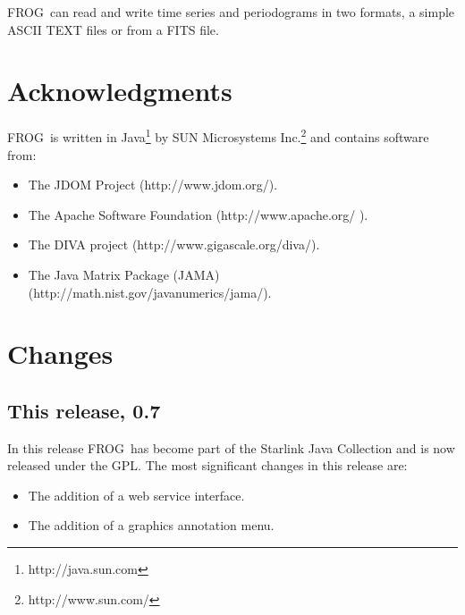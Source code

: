 \documentclass[twoside,11pt]{article}
\newcommand{\htmladdnormallinkfoot}[2]{#1\footnote{#2}}
\newcommand{\htmladdnormallink}[2]{#1}
\newcommand{\xlabel}[1]{}
\renewcommand{\_}{\texttt{\symbol{95}}}
\newcommand{\FROG}{\textsf{FROG}}
\begin{document}
\FROG\ can read and write time series and periodograms in two formats, a simple ASCII TEXT files or from a FITS file.


\section{Acknowledgments\xlabel{acknowledgements}}

\FROG\ is written in
\htmladdnormallinkfoot{Java}{http://java.sun.com} by
\htmladdnormallinkfoot{SUN Microsystems Inc.}{http://www.sun.com/} and
contains software from:
\begin{itemize}
\item The JDOM Project (\htmladdnormallink{http://www.jdom.org/}
                        {http://www.jdom.org/}).
\item The Apache Software Foundation
      (\htmladdnormallink{http://www.apache.org/}{http://www.apache.org/} ).
\item The DIVA project
      (\htmladdnormallink{http://www.gigascale.org/diva/}
                         {http://www.gigascale.org/diva/}).
\item The Java Matrix Package (JAMA)
      (\htmladdnormallink{http://math.nist.gov/javanumerics/jama/}
                         {http://math.nist.gov/javanumerics/jama/}).
\end{itemize}

\section{Changes\xlabel{changes}}
\subsection{This release, 0.7}
In this release \FROG\ has become part of the Starlink Java Collection and is now released under the GPL. The most significant changes in this release are:
\begin{itemize}

   \item The addition of a web service interface.
   
   \item The addition of a graphics annotation menu.
    
\end{itemize}
\end{document}
